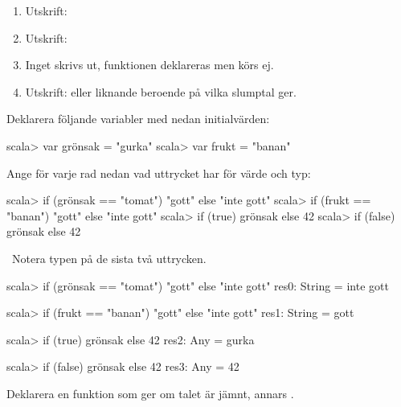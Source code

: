 \TaskSolved \what

\begin{enumerate}
\item Utskrift: 
\item Utskrift: 
\item Inget skrivs ut, funktionen deklareras men körs ej.
\item Utskrift:  eller liknande beroende på vilka slumptal  ger.
\end{enumerate}

\QUESTEND





\QUESTBEGIN

\Task  Deklarera följande variabler med nedan initialvärden:

\begin{REPLnonum}
scala> var grönsak = "gurka"
scala> var frukt = "banan"
\end{REPLnonum}

Ange för varje rad nedan vad uttrycket har för värde och typ:
\begin{REPLnonum}
scala> if (grönsak == "tomat") "gott" else "inte gott"
scala> if (frukt == "banan") "gott" else "inte gott"
scala> if (true) grönsak else 42
scala> if (false) grönsak else 42
\end{REPLnonum}

\SOLUTION


\TaskSolved \what~Notera typen  på de sista två uttrycken.

\begin{REPLnonum}
scala> if (grönsak == "tomat") "gott" else "inte gott"
res0: String = inte gott

scala> if (frukt == "banan") "gott" else "inte gott"
res1: String = gott

scala> if (true) grönsak else 42
res2: Any = gurka

scala> if (false) grönsak else 42
res3: Any = 42
\end{REPLnonum}


\QUESTEND






\QUESTBEGIN

\Task \what

\Subtask Deklarera en funktion  som ger  om talet  är jämnt, annars .

